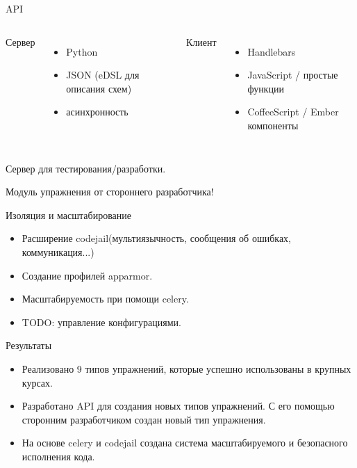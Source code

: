 \documentclass{beamer}
\begin{document}
\begin{frame}{API}
  \begin{columns}[t]
    Сервер
    \begin{itemize}
    \item Python
    \item JSON (eDSL для описания схем)
    \item асинхронность
    \end{itemize}

    Клиент
    \begin{itemize}
    \item Handlebars
    \item JavaScript / простые функции
    \item CoffeeScript / Ember компоненты
    \end{itemize}
  \end{columns}

  \bigskip

  Сервер для тестирования/разработки.

  \medskip

  Модуль упражнения от стороннего разработчика!
\end{frame}

\begin{frame}{Изоляция и масштабирование}
  \begin{itemize}
  \item Расширение codejail(мультиязычность, сообщения об ошибках,
    коммуникация...)
  \item Создание профилей apparmor.
  \item Масштабируемость при помощи celery.
  \item TODO: управление конфигурациями.
  \end{itemize}
\end{frame}

\begin{frame}{Результаты}
  \begin{itemize}
  \item[\checkmark] Реализовано 9 типов упражнений, которые успешно использованы
    в крупных курсах.
  \item[\checkmark] Разработано API для создания новых типов упражнений. С его
    помощью сторонним разработчиком создан новый тип упражнения.
  \item[\checkmark] На основе celery и codejail создана система масштабируемого и
    безопасного исполнения кода.
  \end{itemize}
\end{frame}
\end{document}
